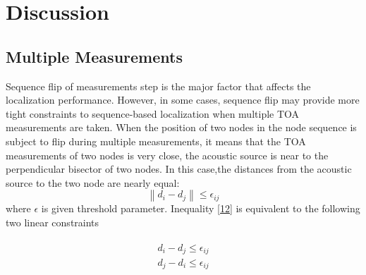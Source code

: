 \section{Discussion}

\subsection{Multiple Measurements}
 Sequence flip of measurements step is the major factor that affects the localization performance.
 However, in some cases, sequence flip may provide more tight constraints to sequence-based localization when multiple TOA measurements are taken. 
 When the position of two nodes in the node sequence is subject to flip during multiple measurements, 
 it means that the TOA measurements of two nodes is very close,  the acoustic source is near to the perpendicular bisector of two nodes.
In this case,the distances from the acoustic source to the two node are nearly equal:
   \begin{equation} \label{12}
 \left\| {d_i - d_j } \right\| \le \epsilon_{ij}
  \end{equation}
 where $\epsilon$ is given threshold parameter. Inequality \eqref{12} is equivalent to the following two linear constraints

 \begin{eqnarray} \label{13}
 \begin{array}{l}
 d_i - d_j \le \epsilon_{ij}  \\
 d_j - d_i \le \epsilon_{ij}  \\
  \end{array}
 \end{eqnarray}








